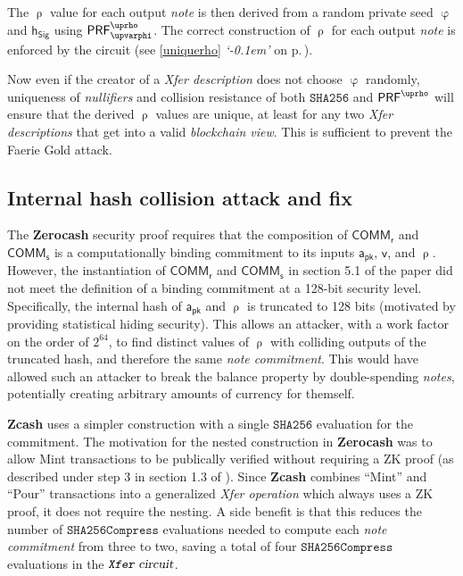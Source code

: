 \documentclass{article}
\newcommand{\crossref}[1]{\autoref{#1} \emph{`\nameref*{#1}\kern -0.1em'} on p.\,\pageref*{#1}}
\newcommand{\term}[1]{\textsl{#1}\xspace}
\newcommand{\termbf}[1]{\textbf{#1}\xspace}
\newcommand{\Zcash}{\termbf{Zcash}}
\newcommand{\Zerocash}{\termbf{Zerocash}}
\newcommand{\coin}{\term{note}}
\newcommand{\coins}{\term{notes}}
\newcommand{\coinCommitment}{\term{note commitment}}
\newcommand{\pourDescription}{\term{Xfer description}}
\newcommand{\pourDescriptions}{\term{Xfer descriptions}}
\newcommand{\pourTransfer}{\term{Xfer operation}}
\newcommand{\blockchainview}{\term{blockchain view}}
\newcommand{\serialNumbers}{\term{nullifiers}}
\newcommand{\FullHash}{\mathtt{SHA256}}
\newcommand{\AuthPublic}{\mathsf{a_{pk}}}
\newcommand{\Value}{\mathsf{v}}
\newcommand{\CoinCommitRand}{\mathsf{r}}
\newcommand{\CoinAddressRand}{\mathsf{\uprho}}
\newcommand{\CoinAddressPreRand}{\mathsf{\upvarphi}}
\newcommand{\CoinCommitS}{\mathsf{s}}
\newcommand{\PRF}[2]{\mathsf{{PRF}^{#2}_\mathnormal{#1}}}
\newcommand{\PRFrho}[1]{\PRF{#1}{\CoinAddressRand}}
\newcommand{\SHA}{\mathtt{SHA256Compress}}
\newcommand{\hSig}{\mathsf{h_{Sig}}}
\newcommand{\PourCircuit}{\term{\texttt{Xfer} circuit}}
\newcommand{\COMM}[1]{\mathsf{COMM}_{#1}}
\begin{document}
The $\CoinAddressRand$ value for each output \coin is then derived from
a random private seed $\CoinAddressPreRand$ and $\hSig$ using
$\PRFrho{\CoinAddressPreRand}$. The correct construction of
$\CoinAddressRand$ for each output \coin is enforced by the circuit
(see \crossref{uniquerho}).

Now even if the creator of a \pourDescription does not choose
$\CoinAddressPreRand$ randomly, uniqueness of \serialNumbers and
collision resistance of both $\FullHash$ and $\PRFrho{}$ will ensure
that the derived $\CoinAddressRand$ values are unique, at least for
any two \pourDescriptions that get into a valid \blockchainview.
This is sufficient to prevent the Faerie Gold attack.


\subsection{Internal hash collision attack and fix}

The \Zerocash security proof requires that the composition of
$\COMM{\CoinCommitRand}$ and $\COMM{\CoinCommitS}$ is a computationally
binding commitment to its inputs $\AuthPublic$, $\Value$, and
$\CoinAddressRand$. However, the instantiation of $\COMM{\CoinCommitRand}$
and $\COMM{\CoinCommitS}$ in section 5.1 of the paper did not meet
the definition of a binding commitment at a 128-bit security level.
Specifically, the internal hash of $\AuthPublic$ and $\CoinAddressRand$
is truncated to 128 bits (motivated by providing statistical hiding
security). This allows an attacker, with a work factor on the order of
$2^{64}$, to find distinct values of $\CoinAddressRand$ with colliding
outputs of the truncated hash, and therefore the same \coinCommitment.
This would have allowed such an attacker to break the balance property
by double-spending \coins, potentially creating arbitrary amounts of
currency for themself.

\Zcash uses a simpler construction with a single $\FullHash$ evaluation
for the commitment. The motivation for the nested construction in \Zerocash
was to allow Mint transactions to be publically verified without requiring
a ZK proof (as described under step 3 in section 1.3 of
\cite{ZerocashOakland}). Since \Zcash combines ``Mint'' and ``Pour''
transactions into a generalized \pourTransfer which always uses a ZK proof,
it does not require the nesting. A side benefit is that this reduces the
number of $\SHA$ evaluations needed to compute each \coinCommitment from
three to two, saving a total of four $\SHA$ evaluations in the
$\PourCircuit$.
\end{document}
